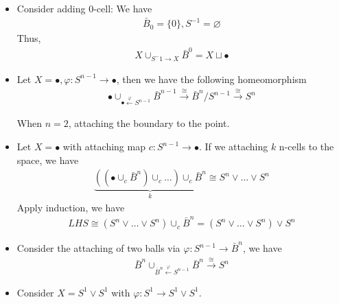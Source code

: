 \documentclass[Total.tex]{subfiles}
\begin{document}
	\begin{example}
		\begin{itemize}
			\item Consider adding $0$-cell: We have
			\begin{gather*}
				\bar{B}_0=\{0\},S^{-1}=\varnothing
			\end{gather*}
			Thus,
			\begin{gather*}
				X\cup_{S^-1\rightarrow X} \bar{B}^0=X\sqcup \bullet
			\end{gather*}
			\item Let $X=\bullet,\varphi:S^{n-1}\rightarrow \bullet$, then we have the following homeomorphism
			\begin{gather*}
				\bullet\cup_{\bullet\stackrel{\varphi}{\leftarrow}S^{n-1}} \bar{B}^{n-1}\stackrel{\cong}{\rightarrow} \bar{B}^n/S^{n-1}\stackrel{\cong}{\rightarrow} S^n
			\end{gather*}
			
			When $n=2$, attaching the boundary to the point.
			\item Let $X=\bullet$ with attaching map $c:S^{n-1}\rightarrow \bullet$. If we attaching $k$ n-cells to the space, we have
			\begin{gather*}
				\underbrace{((\bullet \cup_c \bar{B}^n)\cup_c\dots)\cup_c \bar{B}^n}_{k}\cong S^n\vee\dots\vee S^n
			\end{gather*}
			Apply induction, we have
			\begin{gather*}
				LHS\cong (S^n\vee\dots\vee S^n)\cup_c \bar{B}^n=(S^n\vee\dots\vee S^n)\vee S^n
			\end{gather*}
			\item Consider the attaching of two balls via $\varphi:S^{n-1}\rightarrow\bar{B}^n$, we have
			\begin{gather*}
				\bar{B}^n\cup_{\bar{B}^n\stackrel{\varphi}{\leftarrow} S^{n-1}} \bar{B}^n\stackrel{\cong}{\rightarrow} S^n
			\end{gather*}
			\item Consider $X=S^1\vee S^1$ with $\varphi:S^1\rightarrow S^1\vee S^1$. 
		\end{itemize}
	\end{example}
	
\end{document}
